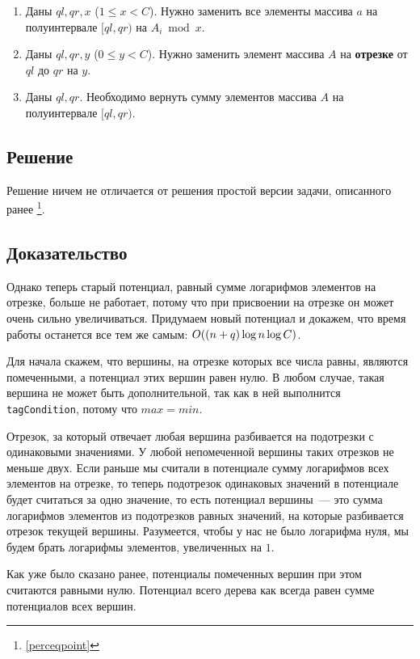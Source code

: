 \begin{enumerate}
    \item Даны $ql, qr, x$ ($1 \le x < C$). Нужно заменить все элементы массива $a$ на полуинтервале $[ql, qr)$ на $A_i \bmod x$.
    \item Даны $ql, qr, y$ ($0 \le y < C$). Нужно заменить элемент массива $A$ на \textbf{отрезке} от $ql$ до $qr$ на $y$.
    \item Даны $ql, qr$. Необходимо вернуть сумму элементов массива $A$ на полуинтервале $[ql, qr)$.
\end{enumerate}

\subsection{Решение}

Решение ничем не отличается от решения простой версии задачи, описанного ранее \footnote{\ref{perceqpoint}}.

\subsection{Доказательство}


Однако теперь старый потенциал, равный сумме логарифмов элементов на отрезке, больше не работает, потому что при присвоении на отрезке он может очень сильно увеличиваться. Придумаем новый потенциал и докажем, что время работы останется все тем же самым: $O((n + q) \log n \log C)$.

Для начала скажем, что вершины, на отрезке которых все числа равны, являются помеченными, а потенциал этих вершин равен нулю. В любом случае, такая вершина не может быть дополнительной, так как в ней выполнится \verb+tagCondition+, потому что $max = min$.

Отрезок, за который отвечает любая вершина разбивается на подотрезки с одинаковыми значениями. У любой непомеченной вершины таких отрезков не меньше двух. Если раньше мы считали в потенциале сумму логарифмов всех элементов на отрезке, то теперь подотрезок одинаковых значений в потенциале будет считаться за одно значение, то есть потенциал вершины~--- это сумма логарифмов элементов из подотрезков равных значений, на которые разбивается отрезок текущей вершины. Разумеется, чтобы у нас не было логарифма нуля, мы будем брать логарифмы элементов, увеличенных на $1$.

Как уже было сказано ранее, потенциалы помеченных вершин при этом считаются равными нулю.
Потенциал всего дерева как всегда равен сумме потенциалов всех вершин.

